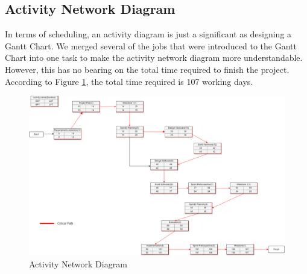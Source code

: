         \subsection{Activity Network Diagram}

            In terms of scheduling, an activity diagram is just a significant as designing a Gantt Chart. We merged several of
            the jobs that were introduced to the Gantt Chart into one task to make the activity network diagram more understandable.
            However, this has no bearing on the total time required to finish the project. According to Figure
            \ref{fig:activity_network_diagram}, the total time required is 107 working days.

            \begin{figure}[H]
              \includegraphics[width=\linewidth]{graphics/AND.drawio.png}
              \caption{Activity Network Diagram}
              \label{fig:activity_network_diagram}
            \end{figure}
